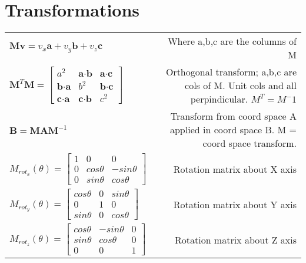 \section{Transformations}

{\setlength{\extrarowheight}{10pt}

\begin{tabulary}{8in}{LR}

$\textbf{M}\textbf{v} = v_x \textbf{a} + v_y \textbf{b} + v_z \textbf{c} $
& Where a,b,c are the columns of M \\

$ \textbf{M}^T \textbf{M} = \begin{bmatrix}
a^2 & \textbf{a} \cdot \textbf{b} & \textbf{a} \cdot \textbf{c} \\
\textbf{b} \cdot \textbf{a} & b^2 & \textbf{b} \cdot \textbf{c} \\
\textbf{c} \cdot \textbf{a} & \textbf{c} \cdot \textbf{b} & c^2
\end{bmatrix}
$
& Orthogonal transform; a,b,c are cols of M. Unit cols and all perpindicular. 
$M^T = M^-1$ \\

$ \textbf{B} = \textbf{M} \textbf{A} \textbf{M}^{-1} $
& Transform from coord space A applied in coord space B. M = coord space transform. \\

$ M_{rot_x}(\theta) = \begin{bmatrix}
1 & 0 & 0 \\
0 & cos \theta & -sin \theta \\
0 & sin \theta & cos \theta
\end{bmatrix}
$
& Rotation matrix about X axis \\

$ M_{rot_y}(\theta) = \begin{bmatrix}
 cos \theta & 0 & sin \theta \\
0 & 1 & 0 \\
sin \theta & 0 & cos \theta
\end{bmatrix}
$
& Rotation matrix about Y axis \\

$ M_{rot_z}(\theta) = \begin{bmatrix}
cos \theta & -sin \theta & 0 \\
sin \theta & cos \theta & 0 \\
0 & 0 & 1
\end{bmatrix}
$
& Rotation matrix about Z axis \\


\end{tabulary}}
